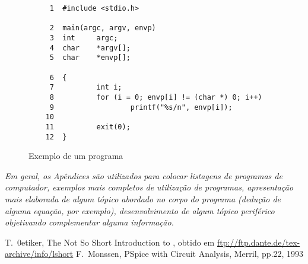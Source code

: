 \documentclass[a4paper,11pt]{article}
\begin{document}
\begin{figure}[H]
 \begin{verbatim}
     1  #include <stdio.h>
       
     2  main(argc, argv, envp)
     3  int     argc;
     4  char    *argv[];
     5  char    *envp[];        
       
     6  {
     7          int i;
     8          for (i = 0; envp[i] != (char *) 0; i++)
     9                  printf("%s/n", envp[i]);
    10          
    11          exit(0);
    12  }
\end{verbatim} 
\caption{Exemplo de um programa}
\end{figure}
\vspace{2.5cm}
{\it Em geral, os Ap{\^e}ndices s{\~a}o utilizados para colocar listagens de programas de computador, exemplos mais completos de utiliza{\c c}{\~a}o de programas, apresenta{\c c}{\~a}o mais elaborada de algum t{\'o}pico abordado no corpo do programa (dedu{\c c}{\~a}o de alguma equa{\c c}{\~a}o, por exemplo), desenvolvimento de algum t{\'o}pico perif{\'e}rico objetivando complementar alguma informa{\c c}{\~a}o.}
\pagebreak


\begin{thebibliography}{99}
 T.~0etiker, The Not So Short Introduction to \LaTeXe{}, obtido em \url{ftp://ftp.dante.de/tex-archive/info/lshort}
 F.~Monssen, PSpice with Circuit Analysis, Merril, pp.22, 1993
\end{thebibliography}
\end{document}

